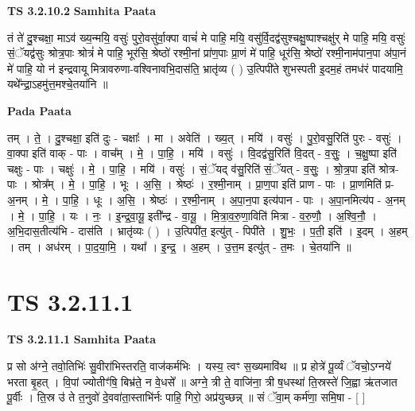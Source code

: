 \documentclass[17pt]{extarticle}
\begin{document}
\textbf{TS 3.2.10.2 } \newline
\textbf{Samhita Paata} \newline

तं ते॑ दु॒श्चक्षा॒ माऽव॑ ख्य॒न्मयि॒ वसुः॑ पुरो॒वसु॑र्वा॒क्पा वाचं॑ मे पाहि॒ मयि॒ वसु॑र्वि॒दद्व॑सुश्चक्षु॒ष्पाश्चक्षु॑र् मे पाहि॒ मयि॒ वसुः॑ सं॒ॅयद्व॑सुः श्रोत्र॒पाः श्रोत्रं॑ मे पाहि॒ भूर॑सि॒ श्रेष्ठो॑ रश्मी॒नां प्रा॑ण॒पाः प्रा॒णं मे॑ पाहि॒ धूर॑सि॒ श्रेष्ठो॑ रश्मी॒नाम॑पान॒पा अ॑पा॒नं मे॑ पाहि॒ यो न॑ इन्द्रवायू मित्रावरुणा-वश्विनावभि॒दास॑ति॒ भ्रातृ॑व्य ( ) उ॒त्पिपी॑ते शुभस्पती इ॒दम॒हं तमध॑रं पादयामि॒ यथे᳚न्द्रा॒ऽहमु॑त्त॒मश्चे॒तया॑नि ॥ \newline

\textbf{Pada Paata} \newline

तम् । ते॒ । दु॒श्चक्षा॒ इति॑ दुः - चक्षाः᳚ । मा । अवेति॑ । ख्य॒त् । मयि॑ । वसुः॑ । पु॒रो॒वसु॒रिति॑ पुरः - वसुः॑ । वा॒क्पा इति॑ वाक् - पाः । वाच᳚म् । मे॒ । पा॒हि॒ । मयि॑ । वसुः॑ । वि॒दद्व॑सु॒रिति॑ वि॒दत् - व॒सुः॒ । च॒क्षु॒ष्पा इति॑ चक्षुः - पाः । चक्षुः॑ । मे॒ । पा॒हि॒ । मयि॑ । वसुः॑ । सं॒ॅयद् व॑सु॒रिति॑ सं॒ॅयत् - व॒सुः॒ । श्रो॒त्र॒पा इति॑ श्रोत्र-पाः । श्रोत्र᳚म् । मे॒ । पा॒हि॒ । भूः । अ॒सि॒ । श्रेष्ठः॑ । र॒श्मी॒नाम् । प्रा॒ण॒पा इति॑ प्राण - पाः । प्रा॒णमिति॑ प्र- अ॒नम् । मे॒ । पा॒हि॒ । धूः । अ॒सि॒ । श्रेष्ठः॑ । र॒श्मी॒नाम् । अ॒पा॒न॒पा इत्य॑पान - पाः । अ॒पा॒नमित्य॑प - अ॒नम् । मे॒ । पा॒हि॒ । यः । नः॒ । इ॒न्द्र॒वा॒यू॒ इती᳚न्द्र - वा॒यू॒ । मि॒त्रा॒व॒रु॒णा॒विति॑ मित्रा - व॒रु॒णौ॒ । अ॒श्वि॒नौ॒ । अ॒भि॒दास॒तीत्य॑भि - दास॑ति । भ्रातृ॑व्यः ( ) । उ॒त्पिपी॑त॒ इत्यु॑त् - पिपी॑ते । शु॒भः॒ । प॒ती॒ इति॑ । इ॒दम् । अ॒हम् । तम् । अध॑रम् । पा॒द॒या॒मि॒ । यथा᳚ । इ॒न्द्र॒ । अ॒हम् । उ॒त्त॒म इत्यु॑त् - त॒मः । चे॒तया॑नि ॥  \newline




\section*{ TS 3.2.11.1 }

\textbf{TS 3.2.11.1 } \newline
\textbf{Samhita Paata} \newline

प्र सो अ॑ग्ने॒ तवो॒तिभिः॑ सु॒वीरा॑भिस्तरति॒ वाज॑कर्मभिः । यस्य॒ त्वꣳ स॒ख्यमावि॑थ ॥ प्र होत्रे॑ पू॒र्व्यं ॅवचो॒ऽग्नये॑ भरता बृ॒हत् । वि॒पां ज्योतीꣳ॑षि॒ बिभ्र॑ते॒ न वे॒धसे᳚ ॥ अग्ने॒ त्री ते॒ वाजि॑ना॒ त्री ष॒धस्था॑ ति॒स्रस्ते॑ जि॒ह्वा ऋ॑तजात पू॒र्वीः । ति॒स्र उ॑ ते त॒नुवो॑ दे॒ववा॑ता॒स्ताभि॑र्नः पाहि॒ गिरो॒ अप्र॑युच्छन्न् ॥ सं ॅवा॒म् कर्म॑णा॒ समि॒षा - [  ] \newline
\end{document}
